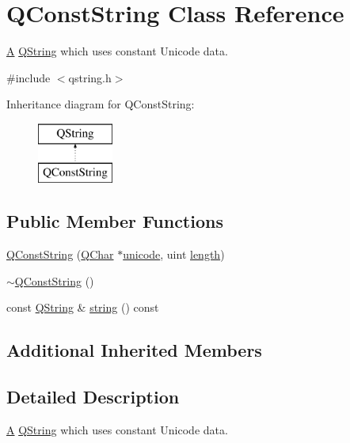 \hypertarget{class_q_const_string}{}\section{Q\+Const\+String Class Reference}
\label{class_q_const_string}


\mbox{\hyperlink{class_a}{A}} \mbox{\hyperlink{class_q_string}{Q\+String}} which uses constant Unicode data.  




{\ttfamily \#include $<$qstring.\+h$>$}

Inheritance diagram for Q\+Const\+String\+:\begin{figure}[H]
\begin{center}
\leavevmode
\includegraphics[height=2.000000cm]{class_q_const_string}
\end{center}
\end{figure}
\subsection*{Public Member Functions}
\begin{DoxyCompactItemize}
\item 
\mbox{\hyperlink{class_q_const_string_afb12679c48e62fbd2ffc14f9ef8b9159}{Q\+Const\+String}} (\mbox{\hyperlink{class_q_char}{Q\+Char}} $\ast$\mbox{\hyperlink{class_q_string_af653a95345ba3cd5bade2a1e07f2bb58}{unicode}}, uint \mbox{\hyperlink{class_q_string_ac431a733d01111059c8364c62ed53270}{length}})
\item 
\mbox{\hyperlink{class_q_const_string_a60c8ed0e36b404ed3d39ab399033facc}{$\sim$\+Q\+Const\+String}} ()
\item 
const \mbox{\hyperlink{class_q_string}{Q\+String}} \& \mbox{\hyperlink{class_q_const_string_a4a47c57ddfdf6d2ed902839f54101f57}{string}} () const
\end{DoxyCompactItemize}
\subsection*{Additional Inherited Members}


\subsection{Detailed Description}
\mbox{\hyperlink{class_a}{A}} \mbox{\hyperlink{class_q_string}{Q\+String}} which uses constant Unicode data. 

